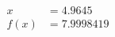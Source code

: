 \documentclass[preview]{standalone}
\begin{document}
\begin{align*}
x &= 4.9645\\f(x) &= 7.9998419
\end{align*}
\end{document}
